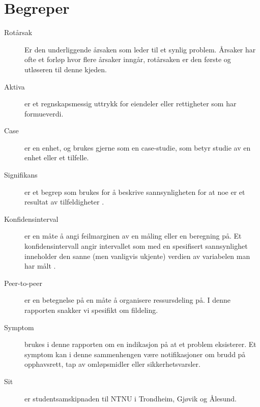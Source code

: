 \section*{Begreper}
\begin{description}
    \item[Rotårsak] Er den underliggende årsaken som leder til et synlig problem. Årsaker har ofte et forløp hvor flere årsaker inngår, rotårsaken er den første og utløseren til denne kjeden.
    \item[Aktiva] er et regnskapsmessig uttrykk for eiendeler eller rettigheter som har formueverdi.
    \item[Case] er en enhet, og brukes gjerne som en case-studie, som betyr studie av en enhet eller et tilfelle.
    \item[Signifikans] er et begrep som brukes for å beskrive sannsynligheten for at noe er et resultat av tilfeldigheter \cite{wiki:sig}.
    \item[Konfidensinterval] er en måte å angi feilmarginen av en måling eller en beregning på. Et konfidensintervall angir intervallet som med en spesifisert sannsynlighet inneholder den sanne (men vanligvis ukjente) verdien av variabelen man har målt \cite{wiki:konfidens}.
    \item[Peer-to-peer] er en betegnelse på en måte å organisere ressursdeling på. I denne rapporten snakker vi spesifikt om fildeling. 
    \item[Symptom] brukes i denne rapporten om en indikasjon på at et problem eksisterer. Et symptom kan i denne sammenhengen være notifikasjoner om brudd på opphavsrett, tap av omløpsmidler eller sikkerhetsvarsler. 
    \item[Sit] er studentsamskipnaden til NTNU i Trondheim, Gjøvik og Ålesund. 
\end{description}